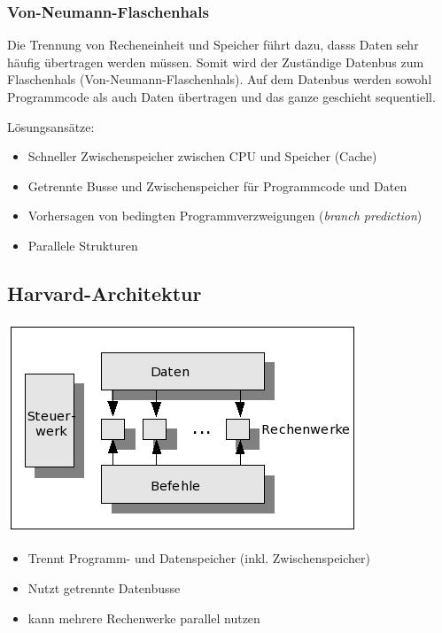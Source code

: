 \subsubsection{Von-Neumann-Flaschenhals}
Die Trennung von Recheneinheit und Speicher führt dazu, dasss Daten sehr häufig übertragen werden müssen. Somit wird der Zuständige Datenbus zum Flaschenhals (Von-Neumann-Flaschenhals).
Auf dem Datenbus werden sowohl Programmcode als auch Daten übertragen und das ganze geschieht sequentiell.

Lösungsansätze:
\begin{itemize}\itemsep0em
	\item Schneller Zwischenspeicher zwischen CPU und Speicher (Cache)
	\item Getrennte Busse und Zwischenspeicher für Programmcode und Daten
	\item Vorhersagen von bedingten Programmverzweigungen (\textit{branch prediction})
	\item Parallele Strukturen
\end{itemize}

\subsection{Harvard-Architektur}
\includegraphics[width=\linewidth]{Harvard-architektur.png}
\begin{itemize}\itemsep0em
	\item Trennt Programm- und Datenspeicher (inkl. Zwischenspeicher)
	\item Nutzt getrennte Datenbusse
	\item kann mehrere Rechenwerke parallel nutzen
\end{itemize}

